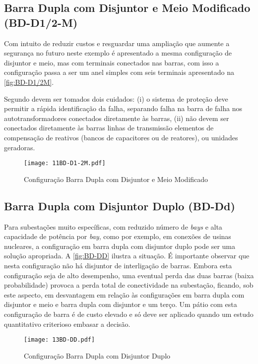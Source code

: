		\subsection{Barra Dupla com Disjuntor e Meio Modificado (BD-D1/2-M)}
			Com intuito de reduzir custos e resguardar uma ampliação que aumente a segurança no futuro neste exemplo é apresentado a mesma configuração de disjuntor e meio, mas com terminais conectados nas barras, com isso a configuração passa a ser um anel simples com seis terminais apresentado na \autoref{fig:BD-D1/2M}.\par
			Segundo  devem ser tomados dois cuidados: (i) o sistema de proteção deve permitir a rápida identificação da falha, separando falha na barra de falha nos autotransformadores conectados diretamente às barras, (ii) não devem ser conectados diretamente às barras linhas de transmissão elementos de compensação de reativos (bancos de capacitores ou de reatores), ou unidades geradoras.\par
			\begin{figure}[!htb]
				\caption{Configuração Barra Dupla com Disjuntor e Meio Modificado}
				\centering
				\texttt{[image: 11BD-D1-2M.pdf]}
				\label{fig:BD-D1/2M}
				\end{figure}
		\subsection{Barra Dupla com Disjuntor Duplo (BD-Dd)}
			Para subestações muito específicas, com reduzido número de \textit{bays} e alta capacidade de potência por \textit{bay}, como por exemplo, em conexões de usinas nucleares, a configuração em barra dupla com disjuntor duplo pode ser uma solução apropriada. A \autoref{fig:BD-DD} ilustra a situação. É importante observar que nesta configuração não há disjuntor de interligação de barras. Embora esta configuração seja de alto desempenho, uma eventual perda das duas barras (baixa probabilidade) provoca a perda total de conectividade na subestação, ficando, sob este aspecto, em desvantagem em relação às configurações em barra dupla com disjuntor e meio e barra dupla com disjuntor e um terço. Um pátio com esta configuração de barra é de custo elevado e só deve ser aplicado quando um estudo quantitativo criterioso embasar a decisão.\par
			\begin{figure}[!htb]
				\caption{Configuração Barra Dupla com Disjuntor Duplo}
				\centering
				\texttt{[image: 13BD-DD.pdf]}
				\label{fig:BD-DD}
				\end{figure}

